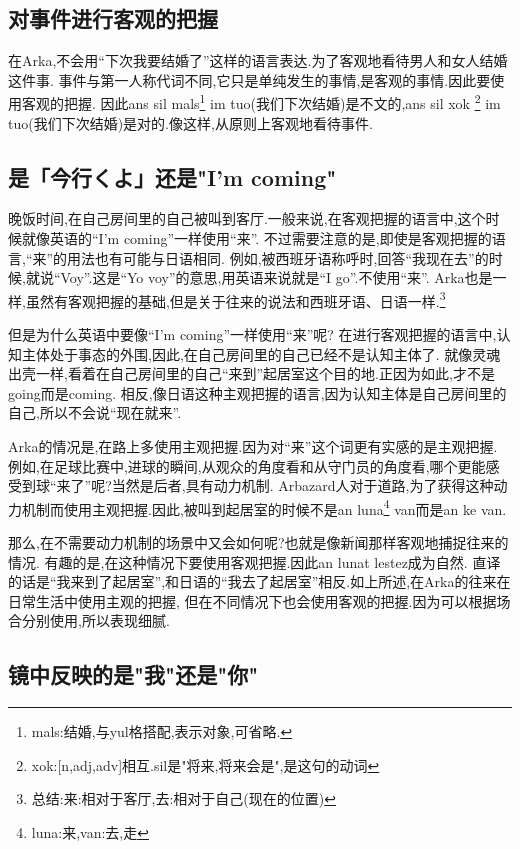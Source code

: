 \subsection{对事件进行客观的把握}

在Arka,不会用``下次我要结婚了''这样的语言表达.为了客观地看待男人和女人结婚这件事.
事件与第一人称代词不同,它只是单纯发生的事情,是客观的事情.因此要使用客观的把握.
因此ans sil mals\footnote{mals:结婚,与yul格搭配,表示对象,可省略.} im tuo(我们下次结婚)是不文的,ans sil xok
\footnote{xok:[n,adj,adv]相互.sil是"将来,将来会是",是这句的动词} im tuo(我们下次结婚)是对的.像这样,从原则上客观地看待事件.
\subsection{是「今行くよ」还是"I'm coming"}
晚饭时间,在自己房间里的自己被叫到客厅.一般来说,在客观把握的语言中,这个时候就像英语的``I'm coming''一样使用``来''.
不过需要注意的是,即使是客观把握的语言,``来''的用法也有可能与日语相同.
例如,被西班牙语称呼时,回答``我现在去''的时候,就说``Voy''.这是``Yo voy''的意思,用英语来说就是``I go''.不使用``来''.
Arka也是一样,虽然有客观把握的基础,但是关于往来的说法和西班牙语、日语一样.\footnote{总结:\quad 来:相对于客厅,去:相对于自己(现在的位置)}

但是为什么英语中要像``I'm coming''一样使用``来''呢?
在进行客观把握的语言中,认知主体处于事态的外围,因此,在自己房间里的自己已经不是认知主体了.
就像灵魂出壳一样,看着在自己房间里的自己``来到''起居室这个目的地.正因为如此,才不是going而是coming.
相反,像日语这种主观把握的语言,因为认知主体是自己房间里的自己,所以不会说``现在就来''.

Arka的情况是,在路上多使用主观把握.因为对``来''这个词更有实感的是主观把握.
例如,在足球比赛中,进球的瞬间,从观众的角度看和从守门员的角度看,哪个更能感受到球``来了''呢?当然是后者,具有动力机制.
Arbazard人对于道路,为了获得这种动力机制而使用主观把握.因此,被叫到起居室的时候不是an luna\footnote{luna:来,van:去,走} van而是an ke van.

那么,在不需要动力机制的场景中又会如何呢?也就是像新闻那样客观地捕捉往来的情况.
有趣的是,在这种情况下要使用客观把握.因此an lunat lestez成为自然.
直译的话是``我来到了起居室'',和日语的``我去了起居室''相反.如上所述,在Arka的往来在日常生活中使用主观的把握,
但在不同情况下也会使用客观的把握.因为可以根据场合分别使用,所以表现细腻.

\subsection{镜中反映的是"我"还是"你"}

